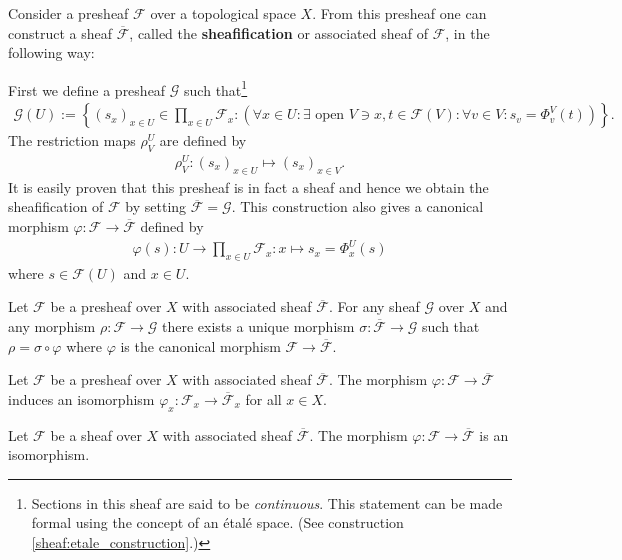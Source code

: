     \begin{construct}
        Consider a presheaf $\mathcal{F}$ over a topological space $X$. From this presheaf one can construct a sheaf $\overline{\mathcal{F}}$, called the \textbf{sheafification} or associated sheaf of $\mathcal{F}$, in the following way:

        First we define a presheaf $\mathcal{G}$ such that\footnote{Sections in this sheaf are said to be \textit{continuous}. This statement can be made formal using the concept of an \'etal\'e space. (See construction \ref{sheaf:etale_construction}.)}
        \begin{gather}
            \mathcal{G}(U) := \left\{(s_x)_{x\in U}\in\prod_{x\in U}\mathcal{F}_x:\left(\forall x\in U: \exists\text{ open }V\ni x, t\in\mathcal{F}(V): \forall v\in V: s_v = \Phi^V_v(t)\right)\right\}.
        \end{gather}
        The restriction maps $\rho^U_V$ are defined by
        \begin{gather}
            \rho^U_V:(s_x)_{x\in U}\mapsto(s_x)_{x\in V}.
        \end{gather}
        It is easily proven that this presheaf is in fact a sheaf and hence we obtain the sheafification of $\mathcal{F}$ by setting $\overline{\mathcal{F}} = \mathcal{G}$. This construction also gives a canonical morphism $\varphi:\mathcal{F}\rightarrow\overline{\mathcal{F}}$ defined by
        \begin{gather}
            \varphi(s):U\rightarrow\prod_{x\in U}\mathcal{F}_x:x \mapsto s_x = \Phi^U_x(s)
        \end{gather}
        where $s\in\mathcal{F}(U)$ and $x\in U$.
    \end{construct}

    \begin{uproperty}
        Let $\mathcal{F}$ be a presheaf over $X$ with associated sheaf $\overline{\mathcal{F}}$. For any sheaf $\mathcal{G}$ over $X$ and any morphism $\rho:\mathcal{F}\rightarrow\mathcal{G}$ there exists a unique morphism $\sigma:\overline{\mathcal{F}}\rightarrow\mathcal{G}$ such that $\rho = \sigma\circ\varphi$ where $\varphi$ is the canonical morphism $\mathcal{F}\rightarrow\overline{\mathcal{F}}$.
    \end{uproperty}

    \begin{property}
        Let $\mathcal{F}$ be a presheaf over $X$ with associated sheaf $\overline{\mathcal{F}}$. The morphism $\varphi:\mathcal{F}\rightarrow\overline{\mathcal{F}}$ induces an isomorphism $\varphi_x:\mathcal{F}_x\rightarrow\overline{\mathcal{F}}_x$ for all $x\in X$.
    \end{property}
    \begin{property}
        Let $\mathcal{F}$ be a sheaf over $X$ with associated sheaf $\overline{\mathcal{F}}$. The morphism $\varphi:\mathcal{F}\rightarrow\overline{\mathcal{F}}$ is an isomorphism.
    \end{property}

